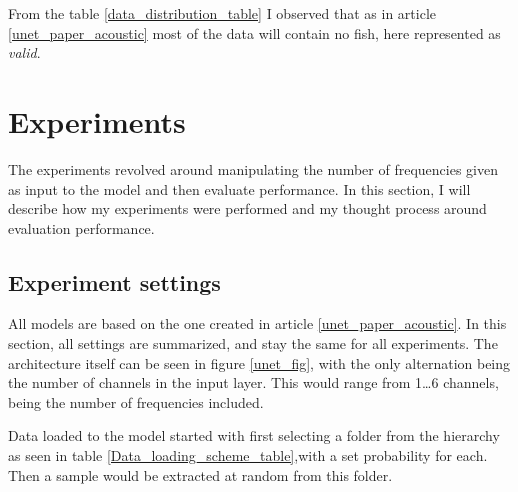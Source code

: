         From the table \ref{data_distribution_table} I observed that as in article \ref{unet_paper_acoustic} most of the data will contain no fish, here represented as \textit{valid}.

\clearpage
\section{Experiments} \label{Experiments}
    The experiments revolved around manipulating the number of frequencies given as input to the model and then evaluate performance. In this section, I will describe how my experiments were performed and my thought process around evaluation performance. 
    
    \subsection{Experiment settings} \label{Experiment settings}
        All models are based on the one created in article \ref{unet_paper_acoustic}. In this section, all settings are summarized, and stay the same for all experiments.
        The architecture itself can be seen in figure \ref{unet_fig}, with the only alternation being the number of channels in the input layer. This would range from 1…6 channels, being the number of frequencies included. 
        
        Data loaded to the model started with first selecting a folder from the hierarchy as seen in table \ref{Data_loading_scheme_table},with a set probability for each. Then a sample would be extracted at random from this folder. 
        
